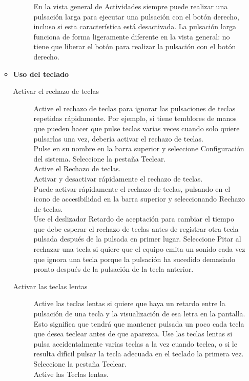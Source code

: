 \begin{itemize}
\begin{itemize}
\begin{description}
En la vista general de Actividades siempre puede realizar una pulsación larga para ejecutar una pulsación con el botón derecho, incluso si esta característica está desactivada. La pulsación larga funciona de forma ligeramente diferente en la vista general: no tiene que liberar el botón para realizar la pulsación con el botón derecho.
			\end{description}
		\item {\large \bf Uso del teclado}
			\begin{description}
				\item[Activar el rechazo de teclas] Active el rechazo de teclas para ignorar las pulsaciones de teclas repetidas rápidamente. Por ejemplo, si tiene temblores de manos que pueden hacer que pulse teclas varias veces cuando solo quiere pulsarlas una vez, debería activar el rechazo de teclas.\\
Pulse en su nombre en la barra superior y seleccione Configuración del sistema.
Seleccione la pestaña Teclear.\\
Active el Rechazo de teclas.\\

Activar y desactivar rápidamente el rechazo de teclas.\\
Puede activar rápidamente el rechazo de teclas, pulsando en el icono de accesibilidad en la barra superior y seleccionando Rechazo de teclas.\\

Use el deslizador Retardo de aceptación para cambiar el tiempo que debe esperar el rechazo de teclas antes de registrar otra tecla pulsada después de la pulsada en primer lugar. Seleccione Pitar al rechazar una tecla si quiere que el equipo emita un sonido cada vez que ignora una tecla porque la pulsación ha sucedido demasiado pronto después de la pulsación de la tecla anterior.
				\item[Activar las teclas lentas] Active las teclas lentas si quiere que haya un retardo entre la pulsación de una tecla y la visualización de esa letra en la pantalla. Esto significa que tendrá que mantener pulsada un poco cada tecla que desea teclear antes de que aparezca. Use las teclas lentas si pulsa accidentalmente varias teclas a la vez cuando teclea, o si le resulta difícil pulsar la tecla adecuada en el teclado la primera vez.\\
				
Seleccione la pestaña Teclear.\\
Active las Teclas lentas.\\


\end{description}
\end{itemize}
\end{itemize}
